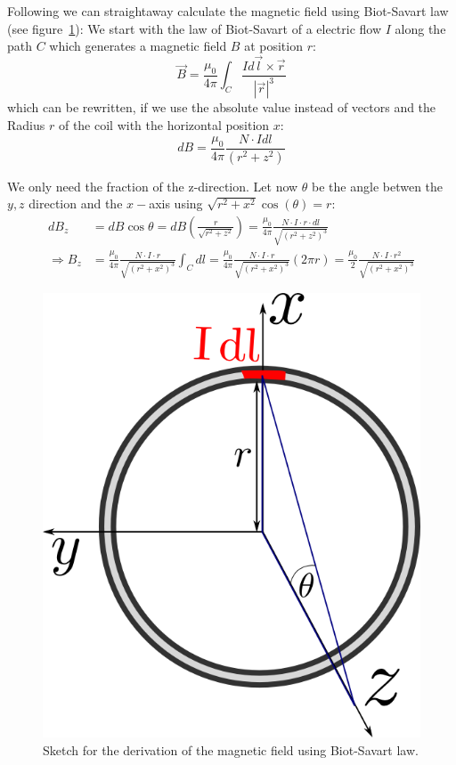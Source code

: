 Following we can straightaway calculate the magnetic field using
Biot-Savart law (see figure~\ref{fig:magnetic_field}):
We start with the law of Biot-Savart of a electric flow $I$ along the path $C$ which generates
a magnetic field $B$ at position $r$:
\begin{equation}
    \vec{B} = \frac{\mu_0}{4\pi} \int_{C} \frac{I d\vec{l} \times \vec{r}}{|\vec{r}|^3} 
\end{equation}
which can be rewritten, if we use the absolute value instead of vectors and the Radius $r$ of the
coil with the horizontal position $x$:
\begin{equation}
    dB = \frac{\mu_0}{4\pi} \frac{N \cdot I dl}{(r^2 + z^2)} 
\end{equation}

We only need the fraction of the z-direction. Let now $\theta$ be the angle betwen the $y,z$ 
direction and the $x-$axis using $\sqrt{{r}^2 + x^2} \cos(\theta) = {r}$:
\begin{align}
     dB_z &= dB \cos\theta = dB \left (\frac{{r}}{\sqrt{{r}^2 + z^2}} \right) = 
    \frac{\mu_0}{4\pi} \frac{N\cdot I  \cdot {r} \cdot dl}{\sqrt{\left ({r}^2 + z^2 \right )^3}} \\
\Rightarrow B_z &= \frac{\mu_0}{4\pi} \frac{N\cdot I  \cdot {r}}{\sqrt{\left ({r}^2 + x^2 \right )^3}} \int_C dl 
  = \frac{\mu_0}{4\pi} \frac{N\cdot I  \cdot {r}}{\sqrt{\left ({r}^2 + x^2 \right )^3}} \left (2\pi {r} \right )
  =  \frac{\mu_0}{2} \frac{N\cdot I  \cdot {r}^2}{\sqrt{\left ({r}^2 + x^2 \right )^3}} 
\end{align}

\begin{figure}[htpb]
    \centering
    \includegraphics[width=0.4\linewidth]{figures/magnetic_field}
    \caption{Sketch for the derivation of the magnetic field using Biot-Savart law.}
    \label{fig:magnetic_field}
\end{figure}



